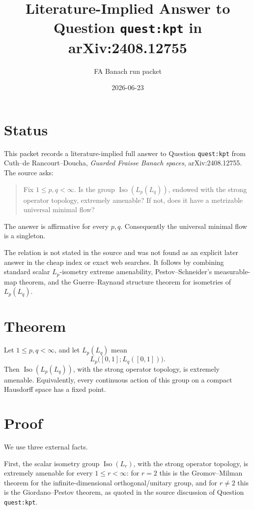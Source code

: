 \documentclass[11pt]{amsart}
\title{Literature-Implied Answer to Question \texttt{quest:kpt} in arXiv:2408.12755}
\author{FA Banach run packet}
\date{2026-06-23}
\DeclareMathOperator{\Iso}{Iso}
\begin{document}
\maketitle

\section*{Status}

This packet records a literature-implied full answer to Question
\texttt{quest:kpt} from Cuth--de Rancourt--Doucha,
\emph{Guarded Fraisse Banach spaces}, arXiv:2408.12755. The source asks:

\begin{quote}
Fix \(1\leq p,q<\infty\). Is the group \(\Iso(L_p(L_q))\), endowed with
the strong operator topology, extremely amenable? If not, does it have a
metrizable universal minimal flow?
\end{quote}

The answer is affirmative for every \(p,q\). Consequently the universal
minimal flow is a singleton.

The relation is not stated in the source and was not found as an explicit
later answer in the cheap index or exact web searches. It follows by combining
standard scalar \(L_p\)-isometry extreme amenability, Pestov--Schneider's
measurable-map theorem, and the Guerre--Raynaud structure theorem for
isometries of \(L_p(L_q)\).

\section*{Theorem}

Let \(1\leq p,q<\infty\), and let \(L_p(L_q)\) mean
\[
  L_p\bigl([0,1]; L_q([0,1])\bigr).
\]
Then \(\Iso(L_p(L_q))\), with the strong operator topology, is extremely
amenable. Equivalently, every continuous action of this group on a compact
Hausdorff space has a fixed point.

\section*{Proof}

We use three external facts.

First, the scalar isometry group \(\Iso(L_r)\), with the strong operator
topology, is extremely amenable for every \(1\leq r<\infty\): for \(r=2\) this
is the Gromov--Milman theorem for the infinite-dimensional orthogonal/unitary
group, and for \(r\neq 2\) this is the Giordano--Pestov theorem, as quoted in
the source discussion of Question \texttt{quest:kpt}.
\end{document}
